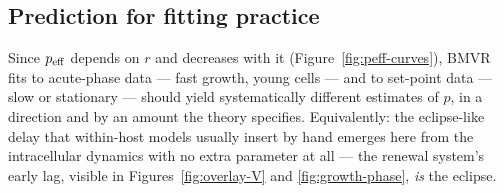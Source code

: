 \subsection{Prediction for fitting practice}

Since $p_{\rm eff}$ depends on $r$ and decreases with it
(Figure~\ref{fig:peff-curves}), BMVR fits to acute-phase data --- fast
growth, young cells --- and to set-point data --- slow or stationary ---
should yield systematically different estimates of $p$, in a direction and
by an amount the theory specifies. Equivalently: the eclipse-like delay
that within-host models usually insert by hand emerges here from the
intracellular dynamics with no extra parameter at all --- the renewal
system's early lag, visible in Figures~\ref{fig:overlay-V} and
\ref{fig:growth-phase}, \emph{is} the eclipse.
